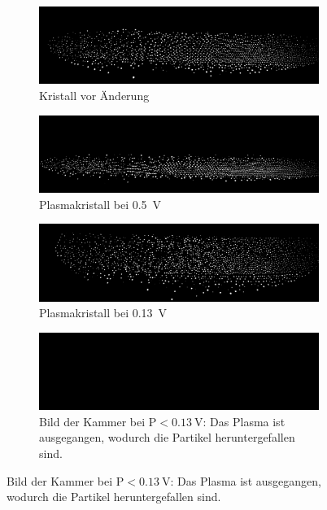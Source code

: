 \documentclass[12pt,a4paper,ngerman]{article}
\begin{document}
	\begin{figure}
		\centering
		\begin{subfigure}[b]{0.45\textwidth}
			\includegraphics[width=\textwidth]{data/Export/ausgangszustand_vorSpannungsaenderung.png}
			\caption{Kristall vor Änderung}
			\label{fig:Spannungsaenderung_sub1}
		\end{subfigure}
		\hfill %
		\begin{subfigure}[b]{0.45\textwidth}
			\includegraphics[width=\textwidth]{data/Export/ausgangszustand_spannung_0.5V.png}
			\caption[Spannungsänderung 1]{Plasmakristall bei \qty{0,5}{\volt}}
			\label{fig:Spannungsaenderung_sub2}
		\end{subfigure}
		
		\begin{subfigure}[b]{0.45\textwidth}
			\includegraphics[width=\textwidth]{data/Export/ausgangszustand_spannung_0.13V.png}
			\caption[Spannungsänderung 2]{Plasmakristall bei \qty{0,13}{\volt}}
			\label{fig:Spannungsaenderung_sub3}
		\end{subfigure}
		\hfill %
		\begin{subfigure}[b]{0.45\textwidth}
			\includegraphics[width=\textwidth]{data/Export/start.png}
			\caption[Leere Kammer]{Bild der Kammer bei $\mathrm{P}<\qty{0,13}{\volt}$: Das Plasma ist ausgegangen, wodurch die Partikel heruntergefallen sind.}
			\label{fig:Spannungsaenderung_sub4}
		\end{subfigure}
		

\end{figure}
\end{document}
